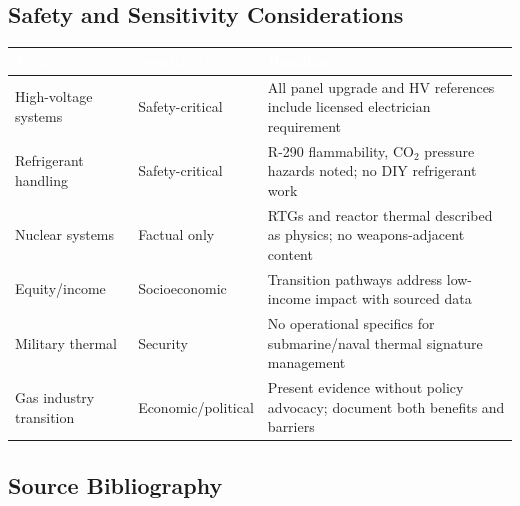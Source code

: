 \documentclass[11pt,letterpaper]{article}
\newcommand{\tableheader}[1]{\textbf{\sffamily\textcolor{white}{#1}}}
\begin{document}
\subsection{Safety and Sensitivity Considerations}

\begin{center}
\begin{tabularx}{\textwidth}{L{3cm}L{3cm}X}
\toprule
{}
\tableheader{Topic} & \tableheader{Sensitivity} & \tableheader{Handling} \\
\midrule
High-voltage systems & Safety-critical & All panel upgrade and HV references include licensed electrician requirement \\
Refrigerant handling & Safety-critical & R-290 flammability, CO$_2$ pressure hazards noted; no DIY refrigerant work \\
Nuclear systems & Factual only & RTGs and reactor thermal described as physics; no weapons-adjacent content \\
Equity/income & Socioeconomic & Transition pathways address low-income impact with sourced data \\
Military thermal & Security & No operational specifics for submarine/naval thermal signature management \\
Gas industry transition & Economic/political & Present evidence without policy advocacy; document both benefits and barriers \\
\bottomrule
\end{tabularx}
\end{center}

\subsection{Source Bibliography}
\end{document}
